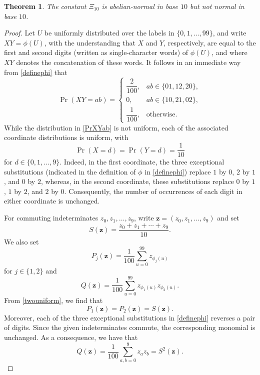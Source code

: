 \documentclass[10pt,a4paper]{amsart}
\newtheorem{theorem}{Theorem}
\begin{document}
\begin{theorem}\label{theoremXi10}
 The constant $\Xi_{10}$ is abelian-normal in base $10$ but not normal
 in base $10$.
\end{theorem}

\begin{proof}
   Let $U$ be uniformly distributed over the labels in   $\{0,1,\ldots,99\}$, and write $XY=\phi(U)$,     with the understanding that $X$ and  
  $Y$, respectively, 
 are equal to the first and second digits (written as single-character words) of $\phi(U)$, 
 and where $XY$ denotes the concatenation of these words. 
 It follows in an immediate way from
\eqref{definephi} that
\begin{equation}\label{PrXYab}
 \operatorname{Pr}(XY=ab)=
 \begin{cases}
 \dfrac{2}{100}, & ab\in\{01,12,20\},\\
 0, & ab\in\{10,21,02\},\\
 \dfrac{1}{100}, & \text{otherwise.}
 \end{cases}
\end{equation}
 While the distribution in \eqref{PrXYab} 
 is not uniform, each of the associated 
 coordinate distributions is uniform, with 
\begin{equation}\label{twouniform}
 \operatorname{Pr}(X=d)=\operatorname{Pr}(Y=d)=\frac{1}{10} 
\end{equation}
 for $ d \in \{ 0, 1, \ldots, 9 \}$. 
 Indeed, in the first coordinate, the three exceptional substitutions 
 (indicated in the definition of $\phi$ in \eqref{definephi}) 
 replace $1$ by $0$, $2$ by $1$, and $0$ by $2$, whereas, in the second
coordinate, these substitutions replace $0$ by $1$, $1$ by $2$, and $2$ by $0$.
Consequently, the number of occurrences of each digit in either
coordinate is unchanged.

For commuting indeterminates $z_0,z_1,\ldots,z_9$, write
$\mathbf z=(z_0,z_1,\ldots,z_9)$ and set
\begin{equation*}
 S(\mathbf z)=\frac{z_0+z_1+\cdots+z_9}{10}.
\end{equation*}
We also set
\begin{equation*}
 P_j(\mathbf z)
 =\frac{1}{100}\sum_{u=0}^{99}z_{\phi_j(u)} 
\end{equation*}
 for $j \in \{ 1, 2 \}$
 and 
 $$ Q(\mathbf z)
 =\frac{1}{100}\sum_{u=0}^{99}
 z_{\phi_1(u)}z_{\phi_2(u)}.
 $$
 From \eqref{twouniform}, we find that 
\begin{equation}\label{singlecoordinateidentities}
 P_1(\mathbf z)=P_2(\mathbf z)=S(\mathbf z).
\end{equation}
Moreover, each of the three exceptional substitutions in
\eqref{definephi} reverses a pair of digits. Since the given 
indeterminates commute, the corresponding monomial is unchanged.
 As a consequence, we have that 
\begin{equation*}
 Q(\mathbf z)
 =\frac{1}{100}\sum_{a,b=0}^{9}z_az_b
 = S^2(\mathbf z).
\end{equation*}


\end{proof}
\end{document}
